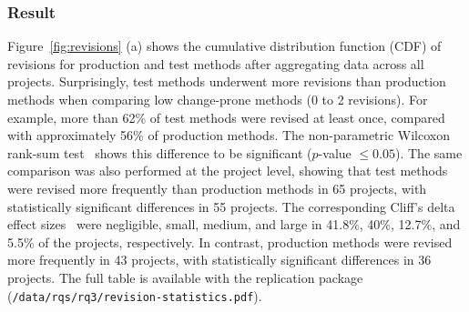 


% 



\subsubsection{Result}
Figure~\ref{fig:revisions} (a) shows the cumulative distribution function (CDF) of revisions for production and test methods after aggregating data across all projects. Surprisingly, test methods underwent more revisions than production methods when comparing low change-prone methods (0 to 2 revisions). For example, more than 62\% of test methods were revised at least once, compared with approximately 56\% of production methods. The non-parametric Wilcoxon rank-sum test~\cite{dzidek2008realistic,chowdhury_evidence_2025} shows this difference to be significant ($p$-value $\leq 0.05$).
The same comparison was also performed at the project level, showing that test methods were revised more frequently than production methods in 65 projects, with statistically significant differences in 55 projects. The corresponding Cliff's delta effect sizes~\cite{Zhang:2013} were negligible, small, medium, and large in 41.8\%, 40\%, 12.7\%, and 5.5\% of the projects, respectively. In contrast, production methods were revised more frequently in 43 projects, with statistically significant differences in 36 projects. The full table is available with the replication package (\texttt{/data/rqs/rq3/revision-statistics.pdf}).

